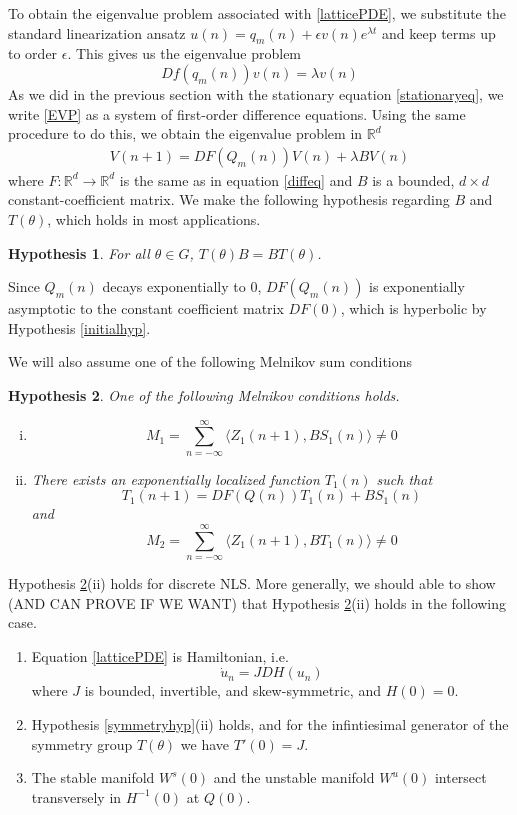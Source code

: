 \documentclass[12pt]{article}
\def\R{{\mathbb R}}
\newtheorem{hypothesis}{Hypothesis}
\begin{document}
To obtain the eigenvalue problem associated with \eqref{latticePDE}, we substitute the standard linearization ansatz $u(n) = q_m(n) + \epsilon v(n) e^{\lambda t}$ and keep terms up to order $\epsilon$. This gives us the eigenvalue problem
\begin{equation}\label{EVP}
Df(q_m(n))v(n) = \lambda v(n)
\end{equation}
As we did in the previous section with the stationary equation \eqref{stationaryeq}, we write \eqref{EVP} as a system of first-order difference equations. Using the same procedure to do this, we obtain the eigenvalue problem in $\R^d$
\begin{align}\label{latticeEVP}
V(n+1) = DF(Q_m(n)) V(n) + \lambda B V(n)
\end{align}
where $F: \R^d \rightarrow \R^d$ is the same as in equation \eqref{diffeq} and $B$ is a bounded, $d\times d$ constant-coefficient matrix. We make the following hypothesis regarding $B$ and $T(\theta)$, which holds in most applications.

\begin{hypothesis}\label{BTcommutehyp}
For all $\theta \in G$, $T(\theta) B = B T(\theta)$.
\end{hypothesis}

Since $Q_m(n)$ decays exponentially to 0, $DF(Q_m(n))$ is exponentially asymptotic to the constant coefficient matrix $DF(0)$, which is hyperbolic by Hypothesis \ref{initialhyp}. 

We will also assume one of the following Melnikov sum conditions
\begin{hypothesis}\label{melnikovhyp}
One of the following Melnikov conditions holds.
\begin{enumerate}[(i)]
\item
\[
M_1 = \sum_{n=-\infty}^\infty \langle Z_1(n+1), B S_1(n) \rangle \neq 0
\]
\item There exists an exponentially localized function $T_1(n)$ such that
\[
T_1(n+1) = DF(Q(n)) T_1(n) + B S_1(n)
\]
and
\[
M_2 = \sum_{n=-\infty}^\infty \langle Z_1(n+1), B T_1(n) \rangle \neq 0 
\]
\end{enumerate}
\end{hypothesis}

Hypothesis \ref{melnikovhyp}(ii) holds for discrete NLS. More generally, we should able to show (AND CAN PROVE IF WE WANT) that Hypothesis \ref{melnikovhyp}(ii) holds in the following case.
\begin{enumerate}
\item Equation \eqref{latticePDE} is Hamiltonian, i.e. 
\[
\dot{u}_n = J DH(u_n)
\]
where $J$ is bounded, invertible, and skew-symmetric, and $H(0) = 0$.
\item Hypothesis \ref{symmetryhyp}(ii) holds, and for the infintiesimal generator of the symmetry group $T(\theta)$ we have $T'(0) = J$.
\item The stable manifold $W^s(0)$ and the unstable manifold $W^u(0)$ intersect transversely in $H^{-1}(0)$ at $Q(0)$.
\end{enumerate}
\end{document}
